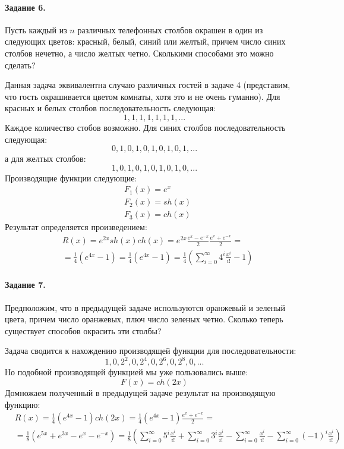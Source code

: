 \documentclass[a4paper,12pt]{article}
\begin{document}
\paragraph{Задание 6.} Пусть каждый из $n$ различных телефонных столбов окрашен в один из следующих цветов: красный, белый, синий или желтый, причем число синих столбов нечетно, а число желтых четно. Сколькими способами это можно сделать?

\begin{Solution}
Данная задача эквивалентна случаю различных гостей в задаче 4 (представим, что гость окрашивается цветом комнаты, хотя это и не очень гуманно). Для красных и белых столбов последовательность следующая:
\[
	1, 1, 1, 1, 1, 1, 1, ...
\]
Каждое количество стобов возможно.
Для синих столбов последовательность следующая:
\[
	0, 1, 0, 1, 0, 1, 0, 1, 0, 1, ...
\]
а для желтых столбов:
\[
	1, 0, 1, 0, 1, 0, 1, 0, 1, 0, ...
\]
Производящие функции следующие:
\[
	\begin{split}
		& F_1\left(x\right) = e^x \\
		& F_2\left(x\right) = sh\left(x\right) \\
		& F_3\left(x\right) = ch\left(x\right)
	\end{split}
\]
Результат определяется произведением:
\[
	\begin{split}
		& R\left(x\right) = e^{2x}sh\left(x\right)ch\left(x\right) = e^{2x} \frac{e^x - e^{-x}}{2} \frac{e^x + e^{-x}}{2} = \\
		& = \frac{1}{4} \left(e^{4x} - 1\right) = \frac{1}{4}\left(e^{4x} - 1\right) = \frac{1}{4} \left(\sum_{i=0}^{\infty}4^i \frac{x^i}{i!} - 1\right)
	\end{split}
\]
\end{Solution}

\paragraph{Задание 7.} Предположим, что в предыдущей задаче используются оранжевый и зеленый цвета, причем число оранжевых, плюч число зеленых четно. Сколько теперь существует способов окрасить эти столбы?

\begin{Solution}
Задача сводится к нахождению производящей функции для последовательности:
\[
	1, 0, 2^2, 0, 2^4, 0, 2^6, 0, 2^8, 0, ...
\]
Но подобной производящей функцией мы уже пользовались выше:
\[
	F\left(x\right) = ch\left(2x\right)
\]
Домножаем полученный в предыдущей задаче результат на производящую функцию:
\[
	\begin{split}
		& R\left(x\right) = \frac{1}{4} \left(e^{4x} - 1\right) ch\left(2x\right) = \frac{1}{4} \left(e^{4x} - 1\right) \frac{e^x + e^{-x}}{2} = \\
		& = \frac{1}{8} \left(e^{5x} + e^{3x} - e^x - e^{-x}\right) = \frac{1}{8} \left(\sum_{i=0}^{\infty} 5^i \frac{x^i}{i!} + \sum_{i=0}^{\infty} 3^i \frac{x^i}{i!} - \sum_{i=0}^{\infty} \frac{x^i}{i!} - \sum_{i=0}^{\infty} \left(-1\right)^i \frac{x^i}{i!}\right)
	\end{split}
\]
\end{Solution}
\end{document}
